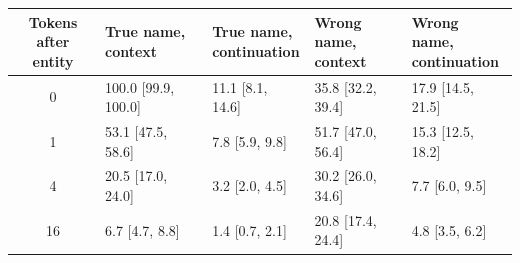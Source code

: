 \begin{tabular}{@{}cllll@{}}
\toprule
\shortstack[l]{Tokens after\\entity} & \shortstack[l]{True name,\\context} & \shortstack[l]{True name,\\continuation} & \shortstack[l]{Wrong name,\\context} & \shortstack[l]{Wrong name,\\continuation} \\
\midrule
0 & 100.0 {\scriptsize[99.9, 100.0]} & 11.1 {\scriptsize[8.1, 14.6]} & 35.8 {\scriptsize[32.2, 39.4]} & 17.9 {\scriptsize[14.5, 21.5]} \\
1 & 53.1 {\scriptsize[47.5, 58.6]} & 7.8 {\scriptsize[5.9, 9.8]} & 51.7 {\scriptsize[47.0, 56.4]} & 15.3 {\scriptsize[12.5, 18.2]} \\
4 & 20.5 {\scriptsize[17.0, 24.0]} & 3.2 {\scriptsize[2.0, 4.5]} & 30.2 {\scriptsize[26.0, 34.6]} & 7.7 {\scriptsize[6.0, 9.5]} \\
16 & 6.7 {\scriptsize[4.7, 8.8]} & 1.4 {\scriptsize[0.7, 2.1]} & 20.8 {\scriptsize[17.4, 24.4]} & 4.8 {\scriptsize[3.5, 6.2]} \\
\bottomrule
\end{tabular}
